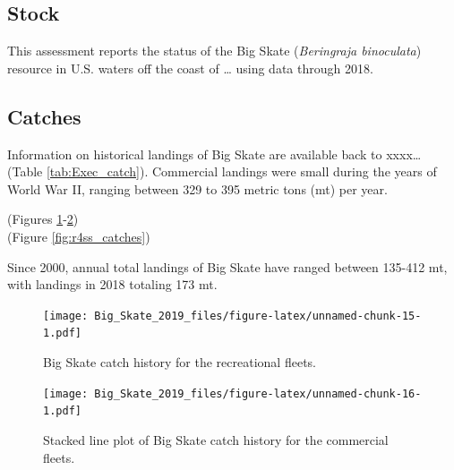 \documentclass[12pt,]{article}
\begin{document}
\hypertarget{stock}{%
\subsection*{Stock}\label{stock}}

This assessment reports the status of the Big Skate
(\emph{Beringraja binoculata}) resource in U.S. waters off the coast of
\ldots{} using data through 2018.

\hypertarget{catches}{%
\subsection*{Catches}\label{catches}}

Information on historical landings of Big Skate are available back to
xxxx\ldots{} (Table \ref{tab:Exec_catch}). Commercial landings were
small during the years of World War II, ranging between 329 to 395
metric tons (mt) per year.

(Figures \ref{fig:Exec_catch1}-\ref{fig:Exec_catch2})\\
(Figure \ref{fig:r4ss_catches})

Since 2000, annual total landings of Big Skate have ranged between
135-412 mt, with landings in 2018 totaling 173 mt.

\FloatBarrier

\begin{figure}
\centering
\texttt{[image: Big\_Skate\_2019\_files/figure-latex/unnamed-chunk-15-1.pdf]}
\caption{Big Skate catch history for the recreational fleets.
\label{fig:Exec_catch1}}
\end{figure}

\begin{figure}
\centering
\texttt{[image: Big\_Skate\_2019\_files/figure-latex/unnamed-chunk-16-1.pdf]}
\caption{Stacked line plot of Big Skate catch history for the commercial
fleets. \label{fig:Exec_catch2}}
\end{figure}

\FloatBarrier
\end{document}
